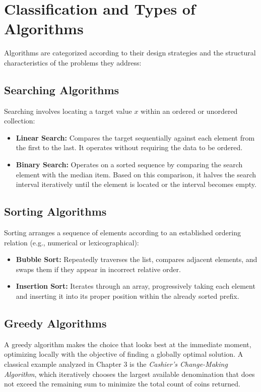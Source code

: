 \documentclass[11pt,a4paper]{article}
\begin{document}
\section{Classification and Types of Algorithms}
Algorithms are categorized according to their design strategies and the structural characteristics of the problems they address:

\subsection{Searching Algorithms}
Searching involves locating a target value $x$ within an ordered or unordered collection:
\begin{itemize}
    \item \textbf{Linear Search:} Compares the target sequentially against each element from the first to the last. It operates without requiring the data to be ordered.
    \item \textbf{Binary Search:} Operates on a sorted sequence by comparing the search element with the median item. Based on this comparison, it halves the search interval iteratively until the element is located or the interval becomes empty.
\end{itemize}

\subsection{Sorting Algorithms}
Sorting arranges a sequence of elements according to an established ordering relation (e.g., numerical or lexicographical):
\begin{itemize}
    \item \textbf{Bubble Sort:} Repeatedly traverses the list, compares adjacent elements, and swaps them if they appear in incorrect relative order.
    \item \textbf{Insertion Sort:} Iterates through an array, progressively taking each element and inserting it into its proper position within the already sorted prefix.
\end{itemize}

\subsection{Greedy Algorithms}
A greedy algorithm makes the choice that looks best at the immediate moment, optimizing locally with the objective of finding a globally optimal solution. A classical example analyzed in Chapter 3 is the \emph{Cashier's Change-Making Algorithm}, which iteratively chooses the largest available denomination that does not exceed the remaining sum to minimize the total count of coins returned.
\end{document}
